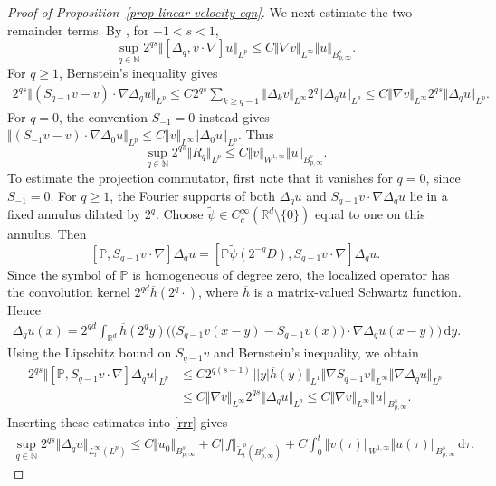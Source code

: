 \documentclass[reqno,11pt,a4paper]{amsart}
\newcommand{\dd}{\mathrm{d}}
\begin{document}
\begin{proof}[Proof of Proposition~\ref{prop-linear-velocity-eqn}]
We next estimate the two remainder terms.
By \cite[Lemma~2.100]{BCD11}, for $-1<s<1$,
\[
  \sup_{q\in\mathbb N}
  2^{qs}\Vert [\Delta_q,v\cdot\nabla]u\Vert _{L^p}
  \leq
  C\Vert \nabla v\Vert _{L^\infty}\Vert u\Vert _{B^s_{p,\infty}}.
\]
For $q\geq1$, Bernstein's inequality gives
\begin{align*}
  2^{qs}
  \Vert (S_{q-1}v-v)\cdot\nabla\Delta_q u\Vert _{L^p}
  \leq
  C2^{qs}
  \sum_{k\geq q-1}
  \Vert \Delta_k v\Vert _{L^\infty}
  2^q\Vert \Delta_q u\Vert _{L^p}
  \leq
  C\Vert \nabla v\Vert _{L^\infty}
  2^{qs}\Vert \Delta_q u\Vert _{L^p}.
\end{align*}
For $q=0$, the convention $S_{-1}=0$ instead gives
$\Vert (S_{-1}v-v)\cdot\nabla\Delta_0 u\Vert _{L^p}\leq C\Vert v\Vert _{L^\infty}\Vert \Delta_0 u\Vert _{L^p}$.
Thus
\[
  \sup_{q\in\mathbb N}2^{qs}\Vert R_q\Vert _{L^p}
  \leq
  C\Vert v\Vert _{W^{1,\infty}}\Vert u\Vert _{B^s_{p,\infty}}.
\]
To estimate the projection commutator, first note that
it vanishes for $q=0$, since $S_{-1}=0$.
For $q\geq1$, the Fourier supports of both
$\Delta_q u$ and
$S_{q-1}v\cdot\nabla\Delta_q u$
lie in a fixed annulus dilated by $2^q$.
Choose
$\widetilde\psi\in
C_c^\infty(\mathbb R^d\setminus\{0\})$
equal to one on this annulus.
Then
\[
  [\mathbb P,S_{q-1}v\cdot\nabla]\Delta_q u
  =
  [\mathbb P\widetilde\psi(2^{-q}D),
    S_{q-1}v\cdot\nabla]\Delta_q u.
\]
Since the symbol of $\mathbb P$ is homogeneous of degree zero,
the localized operator has the convolution kernel
$2^{qd}\overline h(2^q\cdot)$,
where $\overline h$ is a matrix-valued Schwartz function.
Hence
\begin{align*}
  [\mathbb P,S_{q-1}v\cdot\nabla]\Delta_q u(x)
  =
  2^{qd}\int_{\mathbb R^d}
  \overline h(2^q y)
  \Big(
    \big(S_{q-1}v(x-y)-S_{q-1}v(x)\big)
    \cdot\nabla\Delta_q u(x-y)
  \Big)\,\dd y.
\end{align*}
Using the Lipschitz bound on $S_{q-1}v$
and Bernstein's inequality, we obtain
\begin{align*}
  2^{qs}
  \Vert [\mathbb P,S_{q-1}v\cdot\nabla]\Delta_q u\Vert _{L^p}
  &\leq
  C2^{q(s-1)}
  \Vert |y|\overline h(y)\Vert _{L^1}
  \Vert \nabla S_{q-1}v\Vert _{L^\infty}
  \Vert \nabla\Delta_q u\Vert _{L^p}
  \\
  &\leq
  C\Vert \nabla v\Vert _{L^\infty}
  2^{qs}\Vert \Delta_q u\Vert _{L^p} \leq
  C\Vert \nabla v\Vert _{L^\infty}\Vert u\Vert _{B^s_{p,\infty}}.
\end{align*}
Inserting these estimates into \eqref{rrr} gives
\begin{align*}
  \sup_{q\in\mathbb N}
  2^{qs}\Vert \Delta_q u\Vert _{L^\infty_t(L^p)}
  \leq
  C\Vert u_0\Vert _{B^s_{p,\infty}}
  +C\Vert f\Vert _{\widetilde L^\rho_t(B^{s'}_{p,\infty})}
  +
  C\int_0^t
  \Vert v(\tau)\Vert _{W^{1,\infty}}
  \Vert u(\tau)\Vert _{B^s_{p,\infty}}\,\dd\tau.
\end{align*}


\end{proof}
\end{document}

